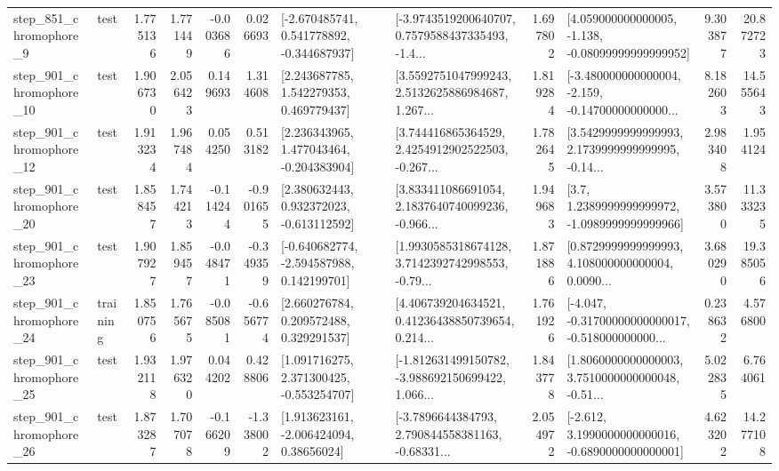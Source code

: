 \begin{tabular}{llrrrrllrlrr}
   step\_851\_chromophore\_9 &      test &      1.775136 &    1.771449 &     -0.003686 &  0.026693 &   [-2.670485741, 0.541778892, -0.344687937] &  [-3.9743519200640707, 0.7579588437335493, -1.4... &       1.697802 &  [4.059000000000005, -1.138, -0.08099999999999952] &            9.303877 &         20.872723 \\
  step\_901\_chromophore\_10 &      test &      1.906730 &    2.056423 &      0.149693 &  1.314608 &     [2.243687785, 1.542279353, 0.469779437] &  [3.5592751047999243, 2.5132625886984687, 1.267... &       1.819284 &  [-3.480000000000004, -2.159, -0.14700000000000... &            8.182603 &         14.555643 \\
  step\_901\_chromophore\_12 &      test &      1.913234 &    1.967484 &      0.054250 &  0.513182 &    [2.236343965, 1.477043464, -0.204383904] &  [3.744416865364529, 2.4254912902522503, -0.267... &       1.782645 &  [3.5429999999999993, 2.1739999999999995, -0.14... &            2.983408 &          1.954124 \\
  step\_901\_chromophore\_20 &      test &      1.858457 &    1.744213 &     -0.114244 & -0.901655 &    [2.380632443, 0.932372023, -0.613112592] &  [3.833411086691054, 2.1837640740099236, -0.966... &       1.949683 &     [3.7, 1.2389999999999972, -1.0989999999999966] &            3.573800 &         11.333235 \\
  step\_901\_chromophore\_23 &      test &      1.907927 &    1.859457 &     -0.048471 & -0.349359 &   [-0.640682774, -2.594587988, 0.142199701] &  [1.9930585318674128, 3.7142392742998553, -0.79... &       1.871886 &  [0.8729999999999993, 4.108000000000004, 0.0090... &            3.680290 &         19.385056 \\
  step\_901\_chromophore\_24 &  training &      1.850756 &    1.765675 &     -0.085081 & -0.656774 &     [2.660276784, 0.209572488, 0.329291537] &  [4.406739204634521, 0.41236438850739654, 0.214... &       1.761926 &  [-4.047, -0.31700000000000017, -0.518000000000... &            0.238632 &          4.576800 \\
  step\_901\_chromophore\_25 &      test &      1.932118 &    1.976320 &      0.044202 &  0.428806 &    [1.091716275, 2.371300425, -0.553254707] &  [-1.812631499150782, -3.988692150699422, 1.066... &       1.843778 &  [1.8060000000000003, 3.7510000000000048, -0.51... &            5.022835 &          6.764061 \\
  step\_901\_chromophore\_26 &      test &      1.873287 &    1.707078 &     -0.166209 & -1.338002 &     [1.913623161, -2.006424094, 0.38656024] &  [-3.7896644384793, 2.790844558381163, -0.68331... &       2.054972 &  [-2.612, 3.1990000000000016, -0.6890000000000001] &            4.623202 &         14.277108 \\

\end{tabular}
